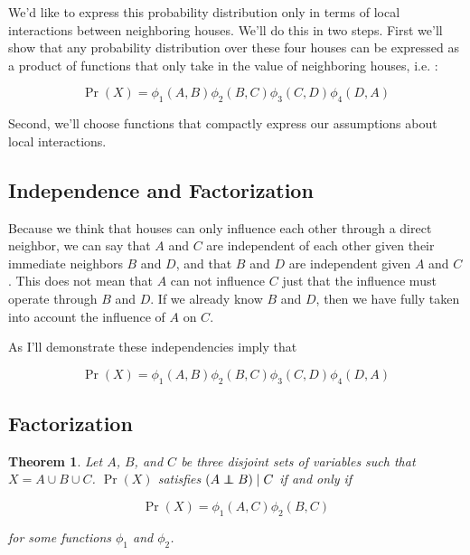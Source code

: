 \documentclass{article}
\newcommand\independent{\protect\mathpalette{\protect\independenT}{\perp}}
\def\independenT#1#2{\mathrel{\rlap{$#1#2$}\mkern2mu{#1#2}}}
\newtheorem{theorem}{Theorem}
\begin{document}
We'd like to express this probability distribution only in terms of
local interactions between neighboring houses. We'll do this in two
steps. First we'll show that any probability distribution over these
four houses can be expressed as a product of functions that only take
in the value of neighboring houses, i.e. :

\begin{equation}
  \Pr(X) = \phi_1(A,B)\phi_2(B,C)\phi_3(C,D)\phi_4(D,A) 
\end{equation}

Second, we'll choose functions that compactly express our assumptions
about local interactions.

\subsection*{Independence and Factorization}
Because we think that houses can only influence each other through a
direct neighbor, we can say that $A$ and $C$ are independent of each
other given their immediate neighbors $B$ and $D$, and that $B$ and
$D$ are independent given $A$ and $C$. This does not mean that $A$ can
not influence $C$ just that the influence must operate through $B$ and
$D$. If we already know $B$ and $D$, then we have fully taken into
account the influence of $A$ on $C$.

As I'll demonstrate these independencies imply that

\begin{equation}
\Pr(X) = \phi_1(A,B)\phi_2(B,C)\phi_3(C,D)\phi_4(D,A) 
\end{equation}


\subsection*{Factorization}

\begin{theorem}
Let $A$, $B$, and $C$ be three disjoint sets of variables such that
$X = A \cup B \cup C$. $\Pr(X)$ satisfies $(A\independent B) \mid C$
if and only if


\begin{equation}
\Pr(X) = \phi_1(A,C)\phi_2(B,C)
\end{equation}

for some functions $\phi_1$ and $\phi_2$.
\end{theorem}
\end{document}
